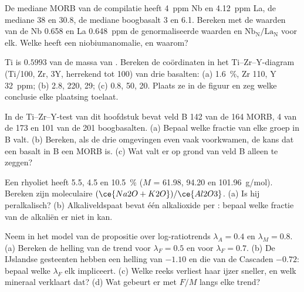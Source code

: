 \begin{exercise}[$\star\star$]\label{exo:b2:magmatic-series:6}
De mediane MORB van de compilatie heeft \qty{4}{ppm} Nb en \qty{4.12}{ppm} La, de
mediane  38 en 30.8, de mediane boogbasalt 3 en 6.1. Bereken met de
waarden van de  Nb 0.658 en La \qty{0.648}{ppm} de genormaliseerde waarden
en $\mathrm{Nb_N}/\mathrm{La_N}$ voor elk. Welke heeft een niobiumanomalie, en waarom?
\end{exercise}

\begin{exercise}[$\star\star$]\label{exo:b2:magmatic-series:7}
Ti is $0.5993$ van de massa van . Bereken de coördinaten in het Ti--Zr--Y-diagram
(Ti/100, Zr, $3\mathrm Y$, herrekend tot 100) van drie basalten: (a) 
\qty{1.6}{\percent}, Zr 110, Y \qty{32}{ppm}; (b) 2.8, 220, 29; (c) 0.8, 50, 20. Plaats
ze in de figuur en zeg welke conclusie elke plaatsing toelaat.
\end{exercise}

\begin{exercise}[$\star\star$]\label{exo:b2:magmatic-series:8}
In de Ti--Zr--Y-test van dit hoofdstuk bevat veld B 142 van de 164 MORB, 4 van de 173
 en 101 van de 201 boogbasalten. (a) Bepaal welke fractie van elke groep
in B valt. (b) Bereken, als de drie omgevingen even vaak voorkwamen, de kans dat een
basalt in B een MORB is. (c) Wat valt er op grond van veld B alleen te zeggen?
\end{exercise}

\begin{exercise}[$\star\star$]\label{exo:b2:magmatic-series:9}
Een rhyoliet heeft  5.5,  4.5 en  \qty{10.5}{\percent} ($M$ =
61.98, 94.20 en \qty{101.96}{g/mol}). Bereken zijn moleculaire $(\ce{Na2O +
K2O})/\ce{Al2O3}$. (a) Is hij peralkalisch? (b) Alkaliveldspaat bevat één
alkalioxide per : bepaal welke fractie van de alkaliën er niet in kan.
\end{exercise}

\begin{exercise}[$\star\star\star$]\label{exo:b2:magmatic-series:10}
Neem in het model van de propositie over log-ratiotrends $\lambda_A = 0.4$ en $\lambda_M =
0.8$. (a) Bereken de helling van de trend voor $\lambda_F = 0.5$ en voor $\lambda_F =
0.7$. (b) De IJslandse gesteenten hebben een helling van $-1.10$ en die van de Cascaden
$-0.72$: bepaal welke $\lambda_F$ elk impliceert. (c) Welke reeks verliest haar ijzer sneller,
en welk mineraal verklaart dat? (d) Wat gebeurt er met $F/M$ langs elke trend?
\end{exercise}

